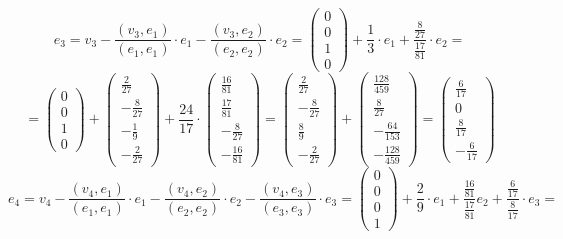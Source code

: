 \documentclass[a4paper,12pt]{article}
\begin{document}
\[
e_3 = v_3 - \frac{(v_3, e_1)}{(e_1, e_1)}  \cdot e_1- \frac{(v_3, e_2)}{(e_2, e_2)} \cdot e_2 = \begin{pmatrix}
0 \\ 0 \\ 1 \\ 0
\end{pmatrix} + \frac{1}{3} \cdot e_1  + \frac{\frac{8}{27}}{\frac{17}{81}} \cdot e_2 = 
\]
\[
=
\begin{pmatrix}
0 \\ 0 \\ 1 \\ 0
\end{pmatrix} + \begin{pmatrix}
\frac{2}{27} \\ -\frac{8}{27} \\-\frac{1}{9} \\ -\frac{2}{27} 
\end{pmatrix} + \frac{24}{17} \cdot \begin{pmatrix}
\frac{16}{81} \\ \frac{17}{81} \\-\frac{8}{27} \\ -\frac{16}{81} 
\end{pmatrix} = \begin{pmatrix}
\frac{2}{27} \\ -\frac{8}{27} \\ \frac{8}{9} \\ -\frac{2}{27} 
\end{pmatrix}  + \begin{pmatrix}
\frac{128}{459} \\ \frac{8}{27} \\-\frac{64}{153} \\ -\frac{128}{459} 
\end{pmatrix}
=
\begin{pmatrix}
\frac{6}{17} \\ 0 \\ \frac{8}{17} \\ -\frac{6}{17}
\end{pmatrix}
\]
\clearpage
\[
e_4 = v_4 - \frac{(v_4, e_1)}{(e_1, e_1)} \cdot e_1 -  \frac{(v_4, e_2)}{(e_2, e_2)} \cdot e_2  -\frac{(v_4, e_3)}{(e_3, e_3)} \cdot e_3 = \begin{pmatrix}
0 \\ 0 \\ 0 \\ 1
\end{pmatrix} 
+ \frac{2}{9} \cdot e_1 + \frac{\frac{16}{81}}{\frac{17}{81}}e_2  + \frac{\frac{6}{17}}{\frac{8}{17}} \cdot e_3 =
\]
\end{document}
